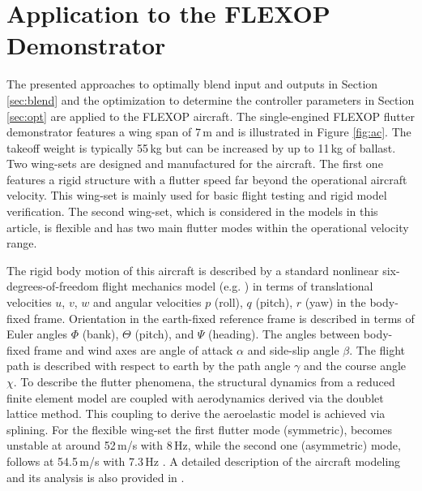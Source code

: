 \documentclass[aerospace,article,submit,moreauthors,pdftex,10pt,a4paper]{Definitions/mdpi}
\begin{document}
\section{Application to the FLEXOP Demonstrator}\label{sec:appl}
The presented approaches to optimally blend input and outputs in Section \ref{sec:blend} and the optimization to determine the controller parameters in Section \ref{sec:opt} are applied to the FLEXOP aircraft. 
The single-engined FLEXOP flutter demonstrator features a wing span of 7\,m and is illustrated in Figure \ref{fig:ac}. The takeoff weight is typically 55\,kg but can be increased by up to 11\,kg of ballast.
Two wing-sets are designed and manufactured for the aircraft. The first one features a rigid structure with a flutter speed far beyond the operational aircraft velocity. This wing-set is mainly used for basic flight testing and rigid model verification. The second wing-set, which is considered in the models in this article, is flexible and has two main flutter modes within the operational velocity range.

The  rigid body motion of this aircraft is described by a standard nonlinear six-degrees-of-freedom flight mechanics model (e.g. \cite{McRuer73}) in terms of translational velocities $u$, $v$, $w$ and angular velocities $p$ (roll), $q$ (pitch), $r$ (yaw) in the body-fixed frame.  Orientation in the earth-fixed reference frame is described in terms of Euler angles $\Phi$ (bank), $\Theta$ (pitch), and $\Psi$  (heading). The angles between body-fixed frame and wind axes are angle of attack $\alpha$ and side-slip angle $\beta$. The flight path is described with respect to earth by the path angle $\gamma$ and the course angle $\chi$. To describe the flutter phenomena, the structural dynamics from a reduced finite element model are coupled with aerodynamics derived via the doublet lattice method. This coupling to derive the aeroelastic model is achieved via splining.
For the flexible wing-set the first flutter mode (symmetric), becomes unstable at around 52\,m/s with 8\,Hz, while the second one (asymmetric) mode, follows at 54.5\,m/s with 7.3\,Hz \cite{Meddaikar19,Iannelli18}. A detailed description of the aircraft modeling and its analysis is also provided in \cite{Wuestenhagen18,Rozov17}.
\end{document}
